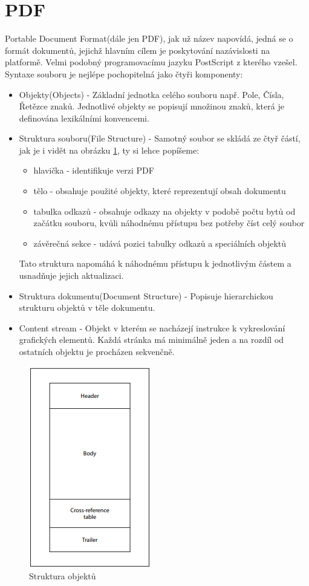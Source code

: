 \section{PDF}
	Portable Document Format(dále jen PDF), jak už název napovídá, jedná se o formát dokumentů, jejichž hlavním cílem je poskytování nazávislosti na platformě. Velmi podobný programovacímu jazyku PostScript z kterého vzešel. Syntaxe souboru je nejlépe pochopitelná jako čtyři komponenty\cite{pdf}: 
	\begin{itemize}
		\item Objekty(Objects) - Základní jednotka celého souboru např. Pole, Čísla, Řetězce znaků. Jednotlivé objekty se popisují množinou znaků, která je definována lexikálními konvencemi.
		\item Struktura souboru(File Structure) - Samotný soubor se skládá ze čtyř částí, jak je i vidět na obrázku \ref{fig:pdf}, ty si lehce popíšeme: 
			\begin{itemize}
				\item hlavička - identifikuje verzi PDF
				\item tělo - obsahuje použité objekty, které reprezentují obsah dokumentu
				\item tabulka odkazů - obsahuje odkazy na objekty v podobě počtu bytů od začátku souboru, kvůli náhodnému přístupu bez potřeby číst celý soubor
				\item závěrečná sekce - udává pozici tabulky odkazů a speciálních objektů
			\end{itemize}
		Tato struktura napomáhá k náhodnému přístupu k jednotlivým částem a usnadňuje jejich aktualizaci.
		\item Struktura dokumentu(Document Structure) - Popisuje hierarchickou strukturu objektů v těle dokumentu.
		\item Content stream - Objekt v kterém se nacházejí instrukce k vykreslování grafických elementů. Každá stránka má minimálně jeden a na rozdíl od ostatních objektu je procházen sekvenčně.	
	\end{itemize}

	\newpage
	\begin{figure}[H]
		\includegraphics[scale=0.9]{Untitled}
		\centering
		\caption{Struktura objektů}
		\label{fig:pdf}
	\end{figure}

